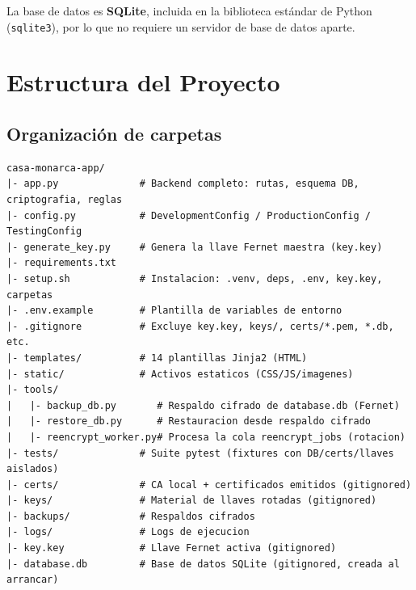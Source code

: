 \documentclass[10pt,letterpaper]{report}
\begin{document}
La base de datos es \textbf{SQLite}, incluida en la biblioteca est\'andar de Python (\texttt{sqlite3}),
por lo que no requiere un servidor de base de datos aparte.

\chapter{Estructura del Proyecto}

\section{Organizaci\'on de carpetas}
\begin{lstlisting}[style=plain]
casa-monarca-app/
|- app.py              # Backend completo: rutas, esquema DB, criptografia, reglas
|- config.py           # DevelopmentConfig / ProductionConfig / TestingConfig
|- generate_key.py     # Genera la llave Fernet maestra (key.key)
|- requirements.txt
|- setup.sh            # Instalacion: .venv, deps, .env, key.key, carpetas
|- .env.example        # Plantilla de variables de entorno
|- .gitignore          # Excluye key.key, keys/, certs/*.pem, *.db, etc.
|- templates/          # 14 plantillas Jinja2 (HTML)
|- static/             # Activos estaticos (CSS/JS/imagenes)
|- tools/
|   |- backup_db.py       # Respaldo cifrado de database.db (Fernet)
|   |- restore_db.py      # Restauracion desde respaldo cifrado
|   |- reencrypt_worker.py# Procesa la cola reencrypt_jobs (rotacion)
|- tests/              # Suite pytest (fixtures con DB/certs/llaves aislados)
|- certs/              # CA local + certificados emitidos (gitignored)
|- keys/               # Material de llaves rotadas (gitignored)
|- backups/            # Respaldos cifrados
|- logs/               # Logs de ejecucion
|- key.key             # Llave Fernet activa (gitignored)
|- database.db         # Base de datos SQLite (gitignored, creada al arrancar)
\end{lstlisting}
\end{document}
